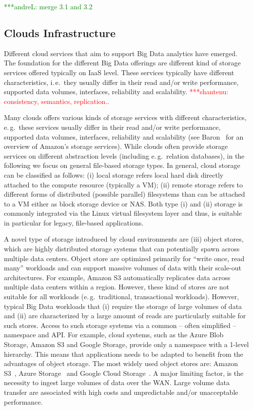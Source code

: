 \documentclass[times]{cpeauth}
\newcommand{\jhanote}[1]{ {\textcolor{red} { ***shantenu: #1 }}}
\newcommand{\alnote}[1]{ {\textcolor{green} { ***andreL: #1 }}}
\newcommand{\alnote}[1]{}
\newcommand{\jhanote}[1]{}
\begin{document}
\alnote{merge 3.1 and 3.2}
\subsection{Clouds Infrastructure}

Different cloud services that aim to support Big Data analytics have
emerged.  The foundation for the different Big Data offerings are
different kind of storage services offered typically on IaaS
level. These services typically have different characteristics,
i.\,e.\ they usually differ in their read and/or write performance,
supported data volumes, interfaces, reliability and scalability.
\jhanote{consistency, semantics, replication..}

Many clouds offers various kinds of storage services with different
characteristics, e.\,g.\ these services usually differ in their read
and/or write performance, supported data volumes, interfaces,
reliability and scalability (see Baron~\cite{baron2010} for an
overview of Amazon's storage services). While clouds often provide
storage services on different abstraction levels (including e.\,g.\
relation databases), in the following we focus on general file-based
storage types. In general, cloud storage can be classified as follows:
(i) local storage refers local hard disk directly attached to the
compute resource (typically a VM); (ii) remote storage refers to
different forms of distributed (possible parallel) filesystems than
can be attached to a VM either as block storage device or NAS. Both
type (i) and (ii) storage is commonly integrated via the Linux virtual
filesystem layer and thus, is suitable in particular for legacy,
file-based applications.

A novel type of storage introduced by cloud environments are (iii)
object stores, which are highly distributed storage systems that can
potentially spawn across multiple data centers. Object store are
optimized primarily for ``write once, read many'' workloads and can
support massive volumes of data with their scale-out
architectures. For example, Amazon S3 automatically replicates data
across multiple data centers within a region. However, these kind of
stores are not suitable for all workloads (e.\,g.\ traditional,
transactional workloads). However, typical Big Data workloads that (i)
require the storage of large volumes of data and (ii) are
characterized by a large amount of reads are particularly suitable for
such stores. Access to such storage systems via a common -- often
simplified -- namespace and API. For example, cloud systems, such as
the Azure Blob Storage, Amazon S3 and Google Storage, provide only a
namespace with a 1-level hierarchy. This means that applications needs
to be adapted to benefit from the advantages of object storage. The
most widely used object stores are: Amazon S3~\cite{amazons3}, Azure
Storage~\cite{azure-blob-storage} and Google Cloud
Storage~\cite{google-storage}. A major limiting factor, is the
necessity to ingest large volumes of data over the WAN. Large volume
data transfer are associated with high costs and unpredictable and/or
unacceptable performance.
\end{document}
